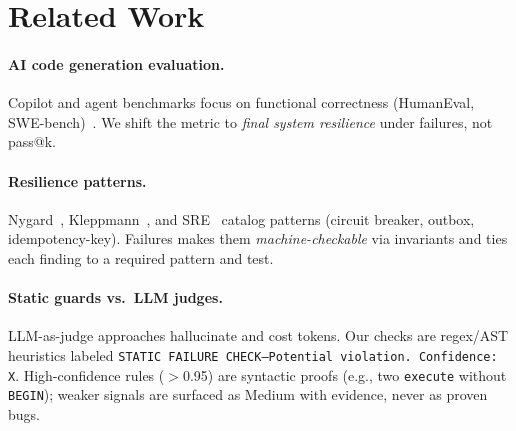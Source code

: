 \section{Related Work}
\paragraph{AI code generation evaluation.} Copilot and agent benchmarks focus on functional correctness (HumanEval, SWE-bench)~\cite{copilot-eval}. We shift the metric to \emph{final system resilience} under failures, not pass@k.

\paragraph{Resilience patterns.} Nygard~\cite{releaseit}, Kleppmann~\cite{ddia}, and SRE~\cite{sre} catalog patterns (circuit breaker, outbox, idempotency-key). Failures makes them \emph{machine-checkable} via invariants and ties each finding to a required pattern and test.

\paragraph{Static guards vs.\ LLM judges.} LLM-as-judge approaches hallucinate and cost tokens. Our checks are regex/AST heuristics labeled \texttt{STATIC FAILURE CHECK---Potential violation. Confidence: X}. High-confidence rules ($>$0.95) are syntactic proofs (e.g., two \texttt{execute} without \texttt{BEGIN}); weaker signals are surfaced as Medium with evidence, never as proven bugs.
